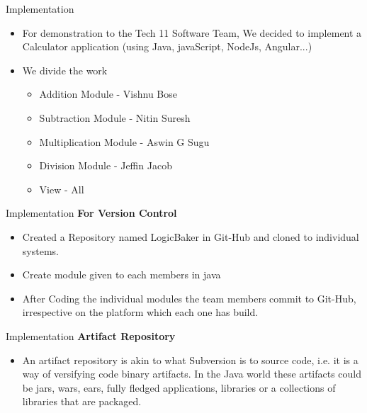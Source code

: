 \documentclass{beamer}
\begin{document}
\begin{frame}{Implementation}

\begin{itemize}
	\item For demonstration to the Tech 11 Software Team, We decided to implement a Calculator application (using Java, javaScript, NodeJs, Angular...)
	\item We divide the work
	\\
	\begin{itemize}
		\item Addition Module - Vishnu Bose
		\item Subtraction Module - Nitin Suresh
		\item Multiplication Module - Aswin G Sugu
		 \item Division Module - Jeffin Jacob
		 \item View - All
	\end{itemize}
\end{itemize}	
\end{frame}



\begin{frame}{Implementation}
	\textbf{For Version Control}
	\begin{itemize}
		\item Created a Repository named LogicBaker in Git-Hub and cloned to individual systems.
		\item Create module given to each members in java
		\item After Coding the individual modules the team members commit to Git-Hub, irrespective on the platform which each one has build.
		
		 
	
	\end{itemize}	
\end{frame}

\begin{frame}{Implementation}
	\textbf{Artifact Repository}
	\begin{itemize}
		\item An artifact repository is akin to what Subversion is to source code, i.e. it is a way of versifying code binary artifacts. In the Java world these artifacts could be jars, wars, ears, fully fledged applications, libraries or a collections of libraries that are packaged.
				
		
	\end{itemize}	
\end{frame}
\end{document}
